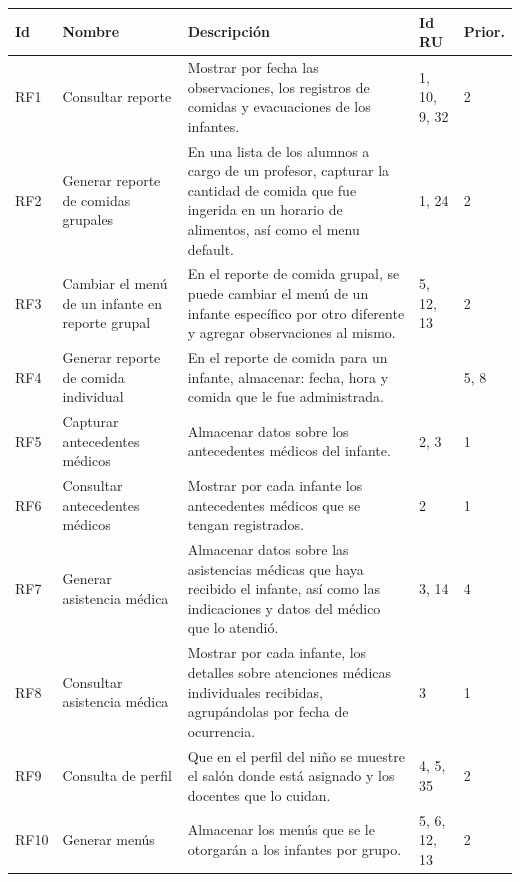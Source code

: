 \documentclass{article}
\begin{document}
\begin{longtable}{|p{1.0cm}|p{3.0cm}|p{5.0cm}|p{1.2cm}|p{0.75cm}|}
	\hline
	Id &
	Nombre &
	Descripción &
	Id RU &
	Prior. \\ \hline


	RF1 &
	Consultar reporte &
	Mostrar por fecha las observaciones, los registros de comidas y evacuaciones de los infantes. &
	1, 10, 9, 32 &
	2 \\ \hline

	RF2 &
	Generar reporte de comidas grupales &
	En una lista de los alumnos a cargo de un profesor, capturar la cantidad de comida que fue ingerida en un horario de alimentos, así como el menu default. &
	1, 24 &
	2 \\ \hline

	RF3 &
	Cambiar el menú de un infante en reporte grupal &
	En el reporte de comida grupal, se puede cambiar el menú de un infante específico por otro diferente y agregar observaciones al mismo. &
	5, 12, 13 &
	2 \\ \hline

	RF4 &
	Generar reporte de comida individual &
	En el reporte de comida para un infante, almacenar: fecha, hora y comida que le fue administrada. &
	&
	5, 8\\ \hline

	RF5 &
	Capturar antecedentes médicos &
	Almacenar datos sobre los antecedentes médicos del infante. &
	2, 3 & 
	 1
	\\ \hline

	RF6 &
	Consultar antecedentes médicos &
	Mostrar por cada infante los antecedentes médicos que se tengan registrados. &
	2 & 
	 1
	\\ \hline

	RF7 &
	Generar asistencia médica &
	Almacenar datos sobre las asistencias médicas que haya recibido el infante, así como las indicaciones y datos del médico que lo atendió. &
	3, 14 & 
	 4
	\\ \hline

	RF8 &
	Consultar asistencia médica &
	Mostrar por cada infante, los detalles sobre atenciones médicas individuales recibidas, agrupándolas por fecha de ocurrencia. &
	3 & 
	 1
	\\ \hline

	RF9 &
	Consulta de perfil &
	Que en el perfil del niño se muestre el salón donde está asignado y  los docentes que lo cuidan. &
	4, 5, 35 & 
	 2
	\\ \hline

	RF10 &
	Generar menús &
	Almacenar los menús que se le otorgarán a los infantes por grupo. &
	5, 6, 12, 13 & 
	 2
	\\ \hline


\end{longtable}
\end{document}
